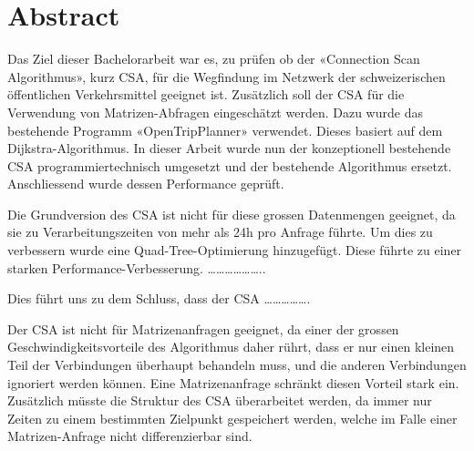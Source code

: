 \section{Abstract}
Das Ziel dieser Bachelorarbeit war es, zu prüfen ob der «Connection Scan Algorithmus», kurz CSA, für die Wegfindung im Netzwerk der schweizerischen öffentlichen Verkehrsmittel geeignet ist. Zusätzlich soll der CSA für die Verwendung von Matrizen-Abfragen eingeschätzt werden. Dazu wurde das bestehende Programm «OpenTripPlanner» verwendet. Dieses basiert auf dem Dijkstra-Algorithmus. In dieser Arbeit wurde nun der konzeptionell bestehende CSA programmiertechnisch umgesetzt und der bestehende Algorithmus ersetzt. Anschliessend wurde dessen Performance geprüft.
\newline


Die Grundversion des CSA ist nicht für diese grossen Datenmengen geeignet, da sie zu Verarbeitungszeiten von mehr als 24h pro Anfrage führte. Um dies zu verbessern wurde eine Quad-Tree-Optimierung hinzugefügt. Diese führte zu einer starken Performance-Verbesserung. ………………..
\newline


Dies führt uns zu dem Schluss, dass der CSA …………….
\newline


Der CSA ist nicht für Matrizenanfragen geeignet, da einer der grossen Geschwindigkeitsvorteile des Algorithmus daher rührt, dass er nur einen kleinen Teil der Verbindungen überhaupt behandeln muss, und die anderen Verbindungen ignoriert werden können. Eine Matrizenanfrage schränkt diesen Vorteil stark ein. Zusätzlich müsste die Struktur des CSA überarbeitet werden, da immer nur Zeiten zu einem bestimmten Zielpunkt gespeichert werden, welche im Falle einer Matrizen-Anfrage nicht differenzierbar sind. 
\newpage





